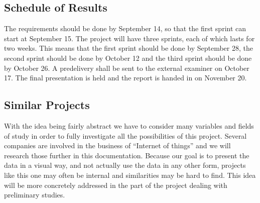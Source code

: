 \documentclass[../document.tex]{subfiles}
\begin{document}
\subsection{Schedule of Results}
The requirements should be done by September 14, so that the first sprint can start at September 15. The project will have three sprints, each of which lasts for two weeks. This means that the first sprint should be done by September 28, the second sprint should be done by October 12 and the third sprint should be done by October 26. A predelivery shall be sent to the external examiner on October 17. The final presentation is held and the report is handed in on November 20.

\subsection{Similar Projects}
With the idea being fairly abstract we have to consider many variables and fields of study in order to fully investigate all the possibilities of this project. Several companies are involved in the business of “Internet of things” and we will research those further in this documentation. Because our goal is to present the data in a visual way, and not actually use the data in any other form, projects like this one may often be internal and similarities may be hard to find. This idea will be more concretely addressed in the part of the project dealing with preliminary studies.
\end{document}
